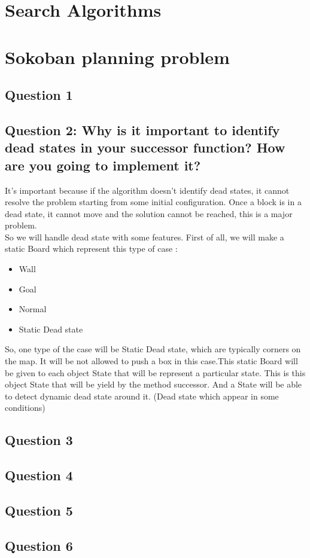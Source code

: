 \documentclass[a4paper,10pt]{article}
\begin{document}
	\newpage
	
	\section{Search Algorithms}
	
	\section{Sokoban planning problem}
	
		\subsection{Question 1}
		
		\subsection{Question 2: Why is it important to identify dead states in your successor function? How are you going to implement it?}
		It's important because if the algorithm doesn't identify dead states, it cannot resolve the problem starting from some initial configuration. Once a block is in a dead state, it cannot move and the solution cannot be reached, this is a major problem. \\
		So we will handle dead state with some features. First of all, we will make a static Board which represent this type of case : 
		\begin{itemize}
			\item Wall 
			\item Goal
			\item Normal
			\item Static Dead state
		\end{itemize}
	So, one type of the case will be Static Dead state, which are typically corners on the map. It will be not allowed to push a box in this case.This static Board will be given to each object State that will be represent a particular state. This is this object State that will be yield by the method successor. And a State will be able to detect dynamic dead state around it. (Dead state which appear in some conditions)
			
		\subsection{Question 3}
		
		\subsection{Question 4}
		
		\subsection{Question 5}
		
		\subsection{Question 6}
\end{document}

